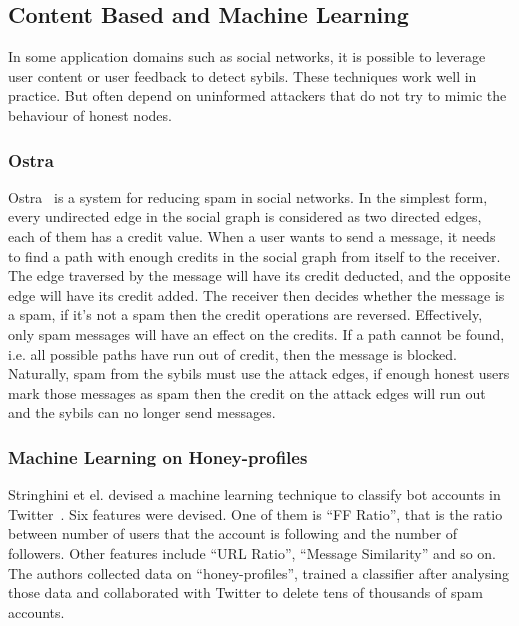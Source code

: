 
\subsection{Content Based and Machine Learning}
\label{sec:content-based}
In some application domains such as social networks, it is possible to leverage
user content or user feedback to detect sybils. These techniques work well in
practice. But often depend on uninformed attackers that do not try to mimic the
behaviour of honest nodes.

\subsubsection{Ostra}
Ostra~\cite{mislove2008ostra} is a system for reducing spam in social networks.
In the simplest form, every undirected edge in the social graph is considered as
two directed edges, each of them has a credit value. When a user wants to send a
message, it needs to find a path with enough credits in the social graph from
itself to the receiver. The edge traversed by the message will have its credit
deducted, and the opposite edge will have its credit added. The receiver then
decides whether the message is a spam, if it's not a spam then the credit
operations are reversed. Effectively, only spam messages will have an effect on
the credits. If a path cannot be found, i.e. all possible paths have run out of
credit, then the message is blocked. Naturally, spam from the sybils must use
the attack edges, if enough honest users mark those messages as spam then the
credit on the attack edges will run out and the sybils can no longer send
messages.

\subsubsection{Machine Learning on Honey-profiles}
Stringhini et el. devised a machine learning technique to classify bot accounts
in Twitter~\cite{stringhini2010detecting}. Six features were devised. One of
them is ``FF Ratio'', that is the ratio between number of users that the account
is following and the number of followers. Other features include ``URL Ratio'',
``Message Similarity'' and so on. The authors collected data on
``honey-profiles'', trained a classifier after analysing those data and
collaborated with Twitter to delete tens of thousands of spam accounts.

